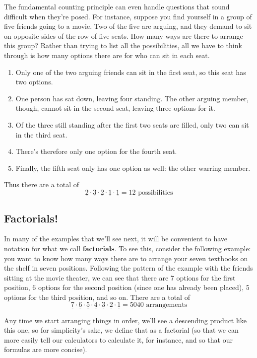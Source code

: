 The fundamental counting principle can even handle questions that sound difficult when they're posed.  For instance, suppose you find yourself in a group of five friends going to a movie.  Two of the five are arguing, and they demand to sit on opposite sides of the row of five seats.  How many ways are there to arrange this group?  Rather than trying to list all the possibilities, all we have to think through is how many options there are for who can sit in each seat.
\begin{enumerate}
\item Only one of the two arguing friends can sit in the first seat, so this seat has two options.
\item One person has sat down, leaving four standing.  The other arguing member, though, cannot sit in the second seat, leaving three options for it.
\item Of the three still standing after the first two seats are filled, only two can sit in the third seat.
\item There's therefore only one option for the fourth seat.
\item Finally, the fifth seat only has one option as well: the other warring member.
\end{enumerate}
Thus there are a total of \[\underline{2} \cdot \underline{3} \cdot \underline{2} \cdot \underline{1} \cdot \underline{1} = 12 \textrm{ possibilities}\]

\subsection{Factorials!}
In many of the examples that we'll see next, it will be convenient to have notation for what we call \textbf{factorials}.  To see this, consider the following example: you want to know how many ways there are to arrange your seven textbooks on the shelf in seven positions.  Following the pattern of the example with the friends sitting at the movie theater, we can see that there are 7 options for the first position, 6 options for the second position (since one has already been placed), 5 options for the third position, and so on.  There are a total of 
\[\underline{7} \cdot \underline{6} \cdot \underline{5} \cdot \underline{4} \cdot \underline{3} \cdot \underline{2} \cdot \underline{1} = 5040 \textrm{ arrangements}\]

Any time we start arranging things in order, we'll see a descending product like this one, so for simplicity's sake, we define that as a factorial (so that we can more easily tell our calculators to calculate it, for instance, and so that our formulas are more concise).

